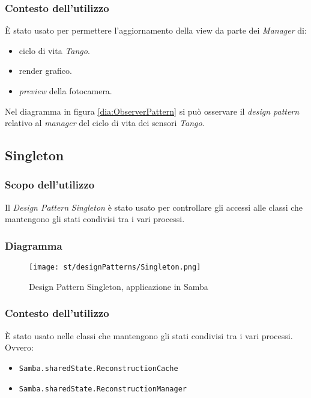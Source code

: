 \subsubsection{Contesto dell'utilizzo}
È stato usato per permettere l'aggiornamento della view da parte dei \emph{Manager} di:
\begin{itemize}
	\item ciclo di vita \emph{Tango}.
	\item render grafico.
	\item \emph{preview} della fotocamera.
\end{itemize}
Nel diagramma in figura \ref{dia:ObserverPattern} si può osservare il \emph{design pattern} relativo al \emph{manager} del ciclo di vita dei sensori \emph{Tango}.

\subsection{Singleton}
\subsubsection{Scopo dell'utilizzo}
Il \emph{Design Pattern} \emph{Singleton} è stato usato per controllare gli accessi alle classi che mantengono gli stati condivisi tra i vari processi. 
\subsubsection{Diagramma}
\begin{figure}[H] 
    \centering 
    \texttt{[image: st/designPatterns/Singleton.png]} 
    \caption{Design Pattern Singleton, applicazione in Samba}
\end{figure}
\subsubsection{Contesto dell'utilizzo}
È stato usato nelle classi che mantengono gli stati condivisi tra i vari processi. Ovvero:
\begin{itemize}
	\item \texttt{Samba.sharedState.ReconstructionCache}
	\item \texttt{Samba.sharedState.ReconstructionManager}	
\end{itemize}



























